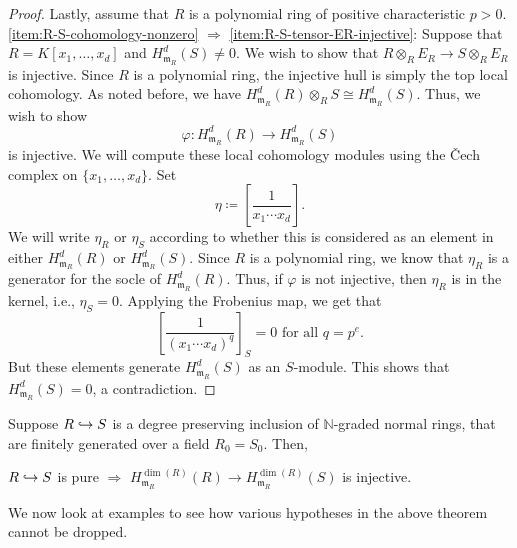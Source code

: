 \documentclass[12pt]{article}
\begin{document}
\begin{proof}
	Lastly, assume that $R$ is a polynomial ring of positive characteristic $p > 0$. \newline
	\ref{item:R-S-cohomology-nonzero} $\Rightarrow$ \ref{item:R-S-tensor-ER-injective}: Suppose that $R = K[x_{1}, \ldots, x_{d}]$ and $H_{\mathfrak{m}_{R}}^{d}(S) \neq 0$. We wish to show that $R \otimes_{R} E_{R} \to S \otimes_{R} E_{R}$ is injective. Since $R$ is a polynomial ring, the injective hull is simply the top local cohomology. As noted before, we have $H_{\mathfrak{m}_{R}}^{d}(R) \otimes_{R} S \cong H_{\mathfrak{m}_{R}}^{d}(S)$. \newline
	Thus, we wish to show 
	\begin{equation*} 
		\varphi : H_{\mathfrak{m}_{R}}^{d}(R) \to H_{\mathfrak{m}_{R}}^{d}(S)
	\end{equation*} 
	is injective. We will compute these local cohomology modules using the \v{C}ech complex on $\{x_{1}, \ldots, x_{d}\}$. Set 
	\begin{equation*} 
		\eta \coloneqq \left[\dfrac{1}{x_{1} \cdots x_{d}}\right].
	\end{equation*}
	We will write $\eta_{R}$ or $\eta_{S}$ according to whether this is considered as an element in either $H_{\mathfrak{m}_{R}}^{d}(R)$ or $H_{\mathfrak{m}_{R}}^{d}(S)$. Since $R$ is a polynomial ring, we know that $\eta_{R}$ is a generator for the socle of $H_{\mathfrak{m}_{R}}^{d}(R)$. Thus, if $\varphi$ is not injective, then $\eta_{R}$ is in the kernel, i.e., $\eta_{S} = 0$. Applying the Frobenius map, we get that 
	\begin{equation*} 
		\left[\dfrac{1}{(x_{1} \cdots x_{d})^{q}}\right]_{S} = 0 \text{ for all $q = p^{e}$}.
	\end{equation*}
	But these elements generate $H_{\mathfrak{m}_{R}}^{d}(S)$ as an $S$-module. This shows that $H_{\mathfrak{m}_{R}}^{d}(S) = 0$, a contradiction.
\end{proof}
\begin{por} \label{por:pure-implies-local-cohomology-injective}
	Suppose $R \hookrightarrow S$ is a degree preserving inclusion of $\mathbb{N}$-graded normal rings, that are finitely generated over a field $R_{0} = S_{0}$. Then,
	\begin{center}
		$R \hookrightarrow S$ is pure \quad $\Rightarrow$ \quad $H_{\mathfrak{m}_{R}}^{\dim(R)}(R) \to H_{\mathfrak{m}_{R}}^{\dim(R)}(S)$ is injective.
	\end{center}
\end{por}

We now look at examples to see how various hypotheses in the above theorem cannot be dropped.
\end{document}
